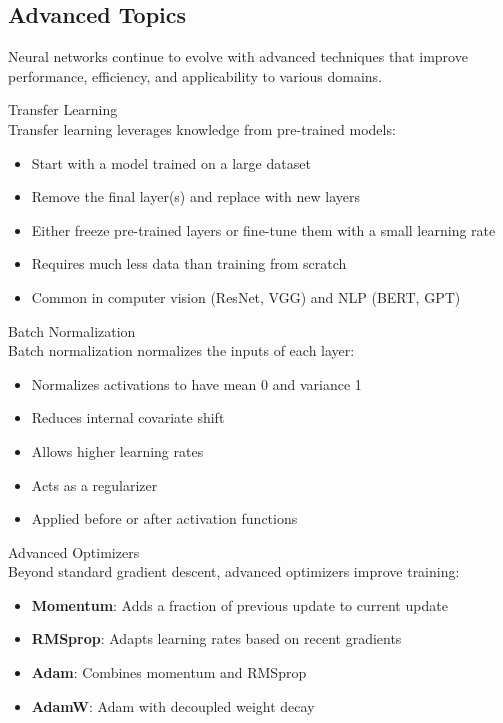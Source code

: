 \subsection{Advanced Topics}

Neural networks continue to evolve with advanced techniques that improve performance, efficiency, and applicability to various domains.

\begin{concept}{Transfer Learning}\\
Transfer learning leverages knowledge from pre-trained models:
\begin{itemize}
    \item Start with a model trained on a large dataset
    \item Remove the final layer(s) and replace with new layers
    \item Either freeze pre-trained layers or fine-tune them with a small learning rate
    \item Requires much less data than training from scratch
    \item Common in computer vision (ResNet, VGG) and NLP (BERT, GPT)
\end{itemize}
\end{concept}

\begin{definition}{Batch Normalization}\\
Batch normalization normalizes the inputs of each layer:
\begin{itemize}
    \item Normalizes activations to have mean 0 and variance 1
    \item Reduces internal covariate shift
    \item Allows higher learning rates
    \item Acts as a regularizer
    \item Applied before or after activation functions
\end{itemize}
\end{definition}

\begin{concept}{Advanced Optimizers}\\
Beyond standard gradient descent, advanced optimizers improve training:
\begin{itemize}
    \item \textbf{Momentum}: Adds a fraction of previous update to current update
    \item \textbf{RMSprop}: Adapts learning rates based on recent gradients
    \item \textbf{Adam}: Combines momentum and RMSprop
    \item \textbf{AdamW}: Adam with decoupled weight decay
\end{itemize}
\end{concept}


